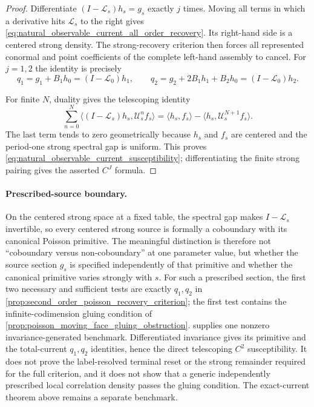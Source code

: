 \documentclass[11pt]{amsart}
\theoremstyle{compactplain}
\theoremstyle{compactdefinition}
\theoremstyle{compactremark}
\newcommand{\Ltransfer}{\mathscr L}
\begin{document}
\begin{proof}
Differentiate \((I-\Ltransfer_s)h_s=g_s\) exactly \(j\) times.  Moving all
terms in which a derivative hits \(\Ltransfer_s\) to the right gives
\eqref{eq:natural_observable_current_all_order_recovery}.  Its right-hand side
is a centered strong density.  The strong-recovery criterion then forces all
represented conormal and point coefficients of the complete left-hand
assembly to cancel.  For \(j=1,2\) the identity is precisely
\[
 q_1=g_1+B_1h_0=(I-\Ltransfer_0)h_1,
 \qquad
 q_2=g_2+2B_1h_1+B_2h_0=(I-\Ltransfer_0)h_2.
\]

For finite \(N\), duality gives the telescoping identity
\[
 \sum_{n=0}^{N}\langle(I-\Ltransfer_s)h_s,
      \mathscr U_s^nf_s\rangle
 =\langle h_s,f_s\rangle
  -\langle h_s,\mathscr U_s^{N+1}f_s\rangle.
\]
The last term tends to zero geometrically because \(h_s\) and \(f_s\) are
centered and the period-one strong spectral gap is uniform.  This proves
\eqref{eq:natural_observable_current_susceptibility}; differentiating the
finite strong pairing gives the asserted \(C^J\) formula.
\end{proof}

\paragraph{Prescribed-source boundary.}
On the centered strong space at a fixed table, the spectral gap makes
\(I-\Ltransfer_s\) invertible, so every centered strong source is formally a
coboundary with its canonical Poisson primitive.  The meaningful distinction
is therefore not ``coboundary versus non-coboundary'' at one parameter value,
but whether the source section \(g_s\) is specified independently of that
primitive and whether the canonical primitive varies strongly with \(s\).
For such a prescribed section, the first two necessary and sufficient tests
are exactly \(q_1,q_2\) in
\cref{prop:second_order_poisson_recovery_criterion}; the first test contains
the infinite-codimension gluing condition of
\cref{prop:poisson_moving_face_gluing_obstruction}.
 supplies one nonzero
invariance-generated benchmark.  Differentiated invariance gives its primitive
and the total-current \(q_1,q_2\) identities, hence the direct telescoping
\(C^2\) susceptibility.  It does not prove the label-resolved terminal reset
or the strong remainder required for the full criterion, and it does not show
that a generic independently prescribed local correlation density passes the
gluing condition.  The exact-current theorem above remains a separate benchmark.
\end{document}
